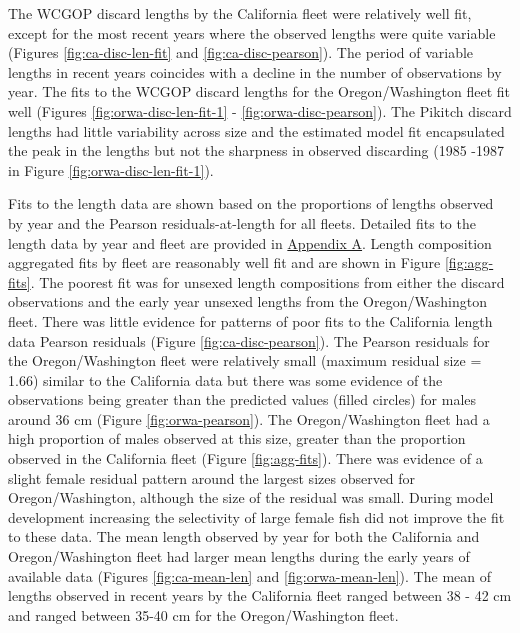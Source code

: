 \documentclass[11pt,
  english,
  a4paper,
]{article}
\begin{document}
\leavevmode\tagmcend\tagstructend\par


The WCGOP discard lengths by the California fleet were relatively well fit, except for the most recent years where the observed lengths were quite variable (Figures \ref{fig:ca-disc-len-fit} and \ref{fig:ca-disc-pearson}). The period of variable lengths in recent years coincides with a decline in the number of observations by year. The fits to the WCGOP discard lengths for the Oregon/Washington fleet fit well (Figures \ref{fig:orwa-disc-len-fit-1} - \ref{fig:orwa-disc-pearson}). The Pikitch discard lengths had little variability across size and the estimated model fit encapsulated the peak in the lengths but not the sharpness in observed discarding (1985 -1987 in Figure \ref{fig:orwa-disc-len-fit-1}).

\leavevmode\tagmcend\tagstructend\par


Fits to the length data are shown based on the proportions of lengths observed by year and the Pearson residuals-at-length for all fleets. Detailed fits to the length data by year and fleet are provided in {\protect\hyperlink{len-fit-data}{Appendix A}\leavevmode\tagmcend\tagstructend}. Length composition aggregated fits by fleet are reasonably well fit and are shown in Figure \ref{fig:agg-fits}. The poorest fit was for unsexed length compositions from either the discard observations and the early year unsexed lengths from the Oregon/Washington fleet. There was little evidence for patterns of poor fits to the California length data Pearson residuals (Figure \ref{fig:ca-disc-pearson}). The Pearson residuals for the Oregon/Washington fleet were relatively small (maximum residual size = 1.66) similar to the California data but there was some evidence of the observations being greater than the predicted values (filled circles) for males around 36 cm (Figure \ref{fig:orwa-pearson}). The Oregon/Washington fleet had a high proportion of males observed at this size, greater than the proportion observed in the California fleet (Figure \ref{fig:agg-fits}). There was evidence of a slight female residual pattern around the largest sizes observed for Oregon/Washington, although the size of the residual was small. During model development increasing the selectivity of large female fish did not improve the fit to these data. The mean length observed by year for both the California and Oregon/Washington fleet had larger mean lengths during the early years of available data (Figures \ref{fig:ca-mean-len} and \ref{fig:orwa-mean-len}). The mean of lengths observed in recent years by the California fleet ranged between 38 - 42 cm and ranged between 35-40 cm for the Oregon/Washington fleet.
\end{document}
